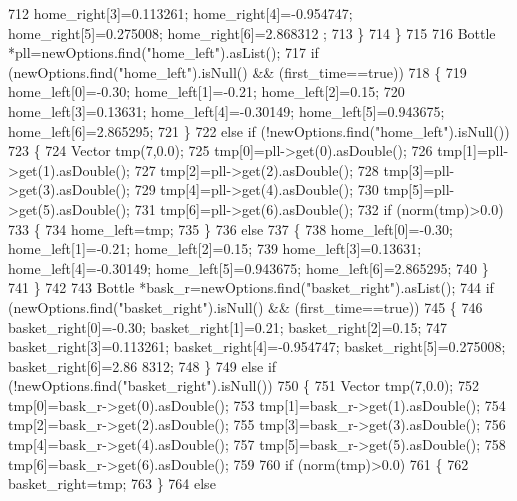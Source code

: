 \begin{DoxyCode}
712             home\_right[3]=0.113261; home\_right[4]=-0.954747; home\_right[5]=0.275008; home\_right[6]=2.868312
      ;
713         \}
714     \}
715 
716     Bottle *pll=newOptions.find(\textcolor{stringliteral}{"home\_left"}).asList();
717     \textcolor{keywordflow}{if} (newOptions.find(\textcolor{stringliteral}{"home\_left"}).isNull() && (first\_time==\textcolor{keyword}{true}))
718     \{
719         home\_left[0]=-0.30; home\_left[1]=-0.21; home\_left[2]=0.15;
720         home\_left[3]=0.13631; home\_left[4]=-0.30149; home\_left[5]=0.943675; home\_left[6]=2.865295;
721     \}
722     \textcolor{keywordflow}{else} \textcolor{keywordflow}{if} (!newOptions.find(\textcolor{stringliteral}{"home\_left"}).isNull())
723     \{
724         Vector tmp(7,0.0);
725         tmp[0]=pll->get(0).asDouble();
726         tmp[1]=pll->get(1).asDouble();
727         tmp[2]=pll->get(2).asDouble();
728         tmp[3]=pll->get(3).asDouble();
729         tmp[4]=pll->get(4).asDouble();
730         tmp[5]=pll->get(5).asDouble();
731         tmp[6]=pll->get(6).asDouble();
732         \textcolor{keywordflow}{if} (norm(tmp)>0.0)
733         \{
734             home\_left=tmp;
735         \}
736         \textcolor{keywordflow}{else}
737         \{
738             home\_left[0]=-0.30; home\_left[1]=-0.21; home\_left[2]=0.15;
739             home\_left[3]=0.13631; home\_left[4]=-0.30149; home\_left[5]=0.943675; home\_left[6]=2.865295;
740         \}
741     \}
742 
743     Bottle *bask\_r=newOptions.find(\textcolor{stringliteral}{"basket\_right"}).asList();
744     \textcolor{keywordflow}{if} (newOptions.find(\textcolor{stringliteral}{"basket\_right"}).isNull() && (first\_time==\textcolor{keyword}{true}))
745     \{
746         basket\_right[0]=-0.30; basket\_right[1]=0.21; basket\_right[2]=0.15;
747         basket\_right[3]=0.113261; basket\_right[4]=-0.954747; basket\_right[5]=0.275008; basket\_right[6]=2.86
      8312;
748     \}
749     \textcolor{keywordflow}{else} \textcolor{keywordflow}{if} (!newOptions.find(\textcolor{stringliteral}{"basket\_right"}).isNull())
750     \{
751         Vector tmp(7,0.0);
752         tmp[0]=bask\_r->get(0).asDouble();
753         tmp[1]=bask\_r->get(1).asDouble();
754         tmp[2]=bask\_r->get(2).asDouble();
755         tmp[3]=bask\_r->get(3).asDouble();
756         tmp[4]=bask\_r->get(4).asDouble();
757         tmp[5]=bask\_r->get(5).asDouble();
758         tmp[6]=bask\_r->get(6).asDouble();
759 
760         \textcolor{keywordflow}{if} (norm(tmp)>0.0)
761         \{
762             basket\_right=tmp;
763         \}
764         \textcolor{keywordflow}{else}

\end{DoxyCode}
